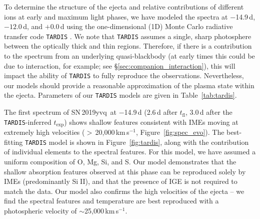\documentclass[twocolumn]{aastex63}
\def\ion#1#2{#1$\;${\footnotesize\rm{#2}}\relax}
\newcommand{\tfl}{$t_\mathrm{fl}$}
\newcommand{\kms}{km\,s$^{-1}$}
\newcommand{\sn}{SN\,2019yvq}
\begin{document}
To determine the structure of the ejecta and relative contributions of
different ions at early and maximum light phases, we have modeled the spectra
at $-$14.9\,d, $-12.0$\,d, and $+$0.0\,d using the one-dimensional (1D) Monte
Carlo radiative transfer code \texttt{TARDIS} \citep{Kerzendorf14}. We note
that \texttt{TARDIS} assumes a single, sharp photosphere between the optically
thick and thin regions. Therefore, if there is a contribution to the spectrum
from an underlying quasi-blackbody (at early times this could be due to
interaction, for example; see \S\ref{sec:companion_interaction}), this will
impact the ability of \texttt{TARDIS} to fully reproduce the observations.
Nevertheless, our models should provide a reasonable approximation of the
plasma state within the ejecta. Parameters of our \texttt{TARDIS} models are
given in Table~\ref{tab:tardis}.



The first spectrum of \sn\ at $-$14.9\,d (2.6\,d after \tfl, 3.0\,d after the
\texttt{TARDIS}-inferred $t_\mathrm{exp}$) shows shallow features consistent
with IMEs moving at extremely high velocities ($>$\,20,000\,\kms,
Figure~\ref{fig:spec_evo}). The best-fitting \texttt{TARDIS} model is shown in
Figure~\ref{fig:tardis}, along with the contribution of individual elements to
the spectral features. For this model, we have assumed a uniform composition
of O, Mg, Si, and S. Our model demonstrates that the shallow absorption
features observed at this phase can be reproduced solely by IMEs
(predominantly \ion{Si}{II}), and that the presence of IGE is not required to
match the data. Our model also confirms the high velocities of the ejecta --
we find the spectral features and temperature are best reproduced with a
photospheric velocity of $\sim$25,000\,\kms.
\end{document}
